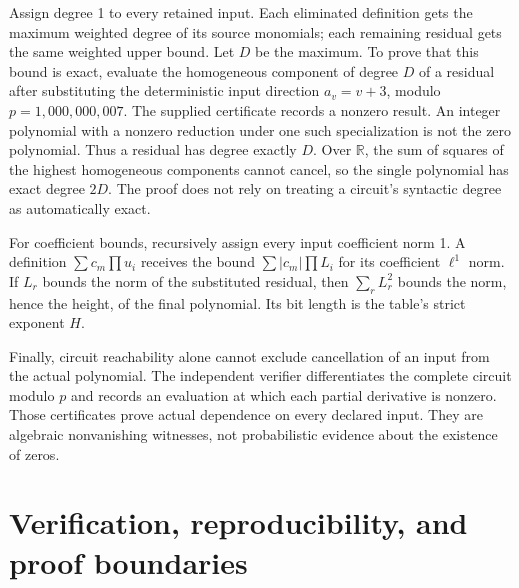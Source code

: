 \documentclass[11pt]{article}
\theoremstyle{definition}\newtheorem{definition}[theorem]{Definition}
\theoremstyle{remark}\newtheorem{remark}[theorem]{Remark}
\newcommand{\R}{\mathbb R}
\begin{document}
Assign degree 1 to every retained input. Each eliminated definition gets
the maximum weighted degree of its source monomials; each remaining
residual gets the same weighted upper bound. Let $D$ be the maximum.
To prove that this bound is exact, evaluate the homogeneous component of
degree $D$ of a residual after substituting the deterministic input
direction $a_v=v+3$, modulo $p=1,000,000,007$. The supplied certificate
records a nonzero result. An integer polynomial with a nonzero reduction
under one such specialization is not the zero polynomial. Thus a residual
has degree exactly $D$. Over $\R$, the sum of squares of the highest
homogeneous components cannot cancel, so the single polynomial has exact
degree $2D$. The proof does not rely on treating a circuit's syntactic
degree as automatically exact.

For coefficient bounds, recursively assign every input coefficient norm
1. A definition $\sum c_m\prod u_i$ receives the bound
$\sum |c_m|\prod L_i$ for its coefficient $\ell^1$ norm. If $L_r$
bounds the norm of the substituted residual, then
$\sum_rL_r^2$ bounds the norm, hence the height, of the final polynomial.
Its bit length is the table's strict exponent $H$.

Finally, circuit reachability alone cannot exclude cancellation of an
input from the actual polynomial. The independent verifier differentiates
the complete circuit modulo $p$ and records an evaluation at which each
partial derivative is nonzero. Those certificates prove actual dependence
on every declared input. They are algebraic nonvanishing witnesses, not
probabilistic evidence about the existence of zeros.



\section{Verification, reproducibility, and proof boundaries}
\label{sec:verification}
\end{document}
